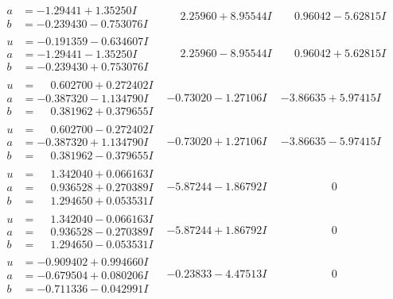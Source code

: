\documentclass[1p]{elsarticle_modified}
\theoremstyle{definition}
\begin{document}
$$\begin{array}{c|c|c}
\begin{aligned}
a &= -1.29441 + 1.35250 I \\
b &= -0.239430 - 0.753076 I\end{aligned}
 & \phantom{-}2.25960 + 8.95544 I & \phantom{-}0.96042 - 5.62815 I \\ \hline\begin{aligned}
u &= -0.191359 - 0.634607 I \\
a &= -1.29441 - 1.35250 I \\
b &= -0.239430 + 0.753076 I\end{aligned}
 & \phantom{-}2.25960 - 8.95544 I & \phantom{-}0.96042 + 5.62815 I \\ \hline\begin{aligned}
u &= \phantom{-}0.602700 + 0.272402 I \\
a &= -0.387320 - 1.134790 I \\
b &= \phantom{-}0.381962 + 0.379655 I\end{aligned}
 & -0.73020 - 1.27106 I & -3.86635 + 5.97415 I \\ \hline\begin{aligned}
u &= \phantom{-}0.602700 - 0.272402 I \\
a &= -0.387320 + 1.134790 I \\
b &= \phantom{-}0.381962 - 0.379655 I\end{aligned}
 & -0.73020 + 1.27106 I & -3.86635 - 5.97415 I \\ \hline\begin{aligned}
u &= \phantom{-}1.342040 + 0.066163 I \\
a &= \phantom{-}0.936528 + 0.270389 I \\
b &= \phantom{-}1.294650 + 0.053531 I\end{aligned}
 & -5.87244 - 1.86792 I & \phantom{-0.000000 } 0 \\ \hline\begin{aligned}
u &= \phantom{-}1.342040 - 0.066163 I \\
a &= \phantom{-}0.936528 - 0.270389 I \\
b &= \phantom{-}1.294650 - 0.053531 I\end{aligned}
 & -5.87244 + 1.86792 I & \phantom{-0.000000 } 0 \\ \hline\begin{aligned}
u &= -0.909402 + 0.994660 I \\
a &= -0.679504 + 0.080206 I \\
b &= -0.711336 - 0.042991 I\end{aligned}
 & -0.23833 - 4.47513 I & \phantom{-0.000000 } 0\\

\end{array}$$
\end{document}
